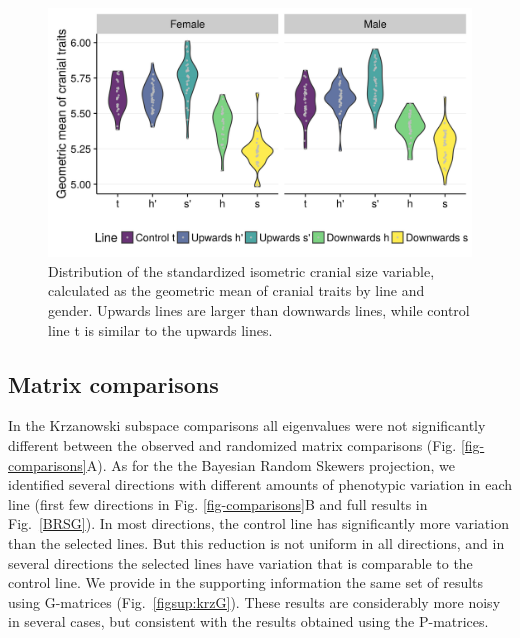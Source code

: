\begin{refsection}
\begin{figure}
    \centering
    \includegraphics[width=\textwidth]{chapter_ratones/media/figure1.png}
    \caption[Selection response in weight]{Distribution of the
standardized isometric cranial size variable, calculated as the
geometric mean of cranial traits by line and gender. Upwards lines are
larger than downwards lines, while control line t is similar to the
upwards lines.}
    \label{fig-gmchange}
\end{figure}


\subsection{Matrix comparisons}


In the Krzanowski subspace comparisons all eigenvalues were not
significantly different between the observed and randomized matrix
comparisons (Fig. \ref{fig-comparisons}A). As for the the Bayesian
Random Skewers projection, we identified several directions with
different amounts of phenotypic variation in each line (first few
directions in Fig. \ref{fig-comparisons}B and full results in Fig.~\ref{BRSG}). 
In most directions, the control line has significantly more
variation than the selected lines. But this reduction is not uniform in
all directions, and in several directions the selected lines have
variation that is comparable to the control line. We provide in the
supporting information the same set of results using G-matrices
(Fig.~\ref{figsup:krzG}). These results are considerably more noisy in several cases,
but consistent with the results obtained using the P-matrices.


\end{refsection}
